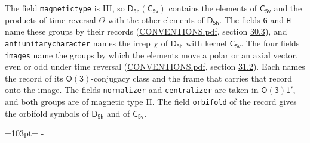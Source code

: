 \documentclass[10pt,a4paper]{article}
\newcommand{\needspace}[1]{\par\penalty-100\begingroup\dimen0=#1\relax\dimen2=\pagegoal
  \advance\dimen2-\pagetotal\ifdim\dimen0>\dimen2\relax\ifdim\dimen2>0pt\vfil\break\fi\fi
  \endgroup}
\numberwithin{equation}{section}
\newcommand{\grp}[1]{\mathsf{#1}}
\begin{document}
The field \texttt{magnetictype} is III, so $\grp{D_{5h}}(\grp{C_{5v}})$ contains the elements of $\grp{C_{5v}}$ and the products of time reversal $\varTheta$ with the other elements of $\grp{D_{5h}}$. The fields \texttt{G} and \texttt{H} name these groups by their records (\href{../../CONVENTIONS.pdf}{CONVENTIONS.pdf}, section \href{../../CONVENTIONS.pdf\#conv.30.3}{30.3}), and \texttt{antiunitarycharacter} names the irrep $\chi$ of $\grp{D_{5h}}$ with kernel $\grp{C_{5v}}$. The four fields \texttt{images} name the groups by which the elements move a polar or an axial vector, even or odd under time reversal (\href{../../CONVENTIONS.pdf}{CONVENTIONS.pdf}, section \href{../../CONVENTIONS.pdf\#conv.31.2}{31.2}). Each names the record of its $\grp{O(3)}$-conjugacy class and the frame that carries that record onto the image. The fields \texttt{normalizer} and \texttt{centralizer} are taken in $\grp{O(3)1'}$, and both groups are of magnetic type II. The field \texttt{orbifold} of the record gives the orbifold symbols of $\grp{D_{5h}}$ and of $\grp{C_{5v}}$.
\needspace{103pt}
\end{document}
